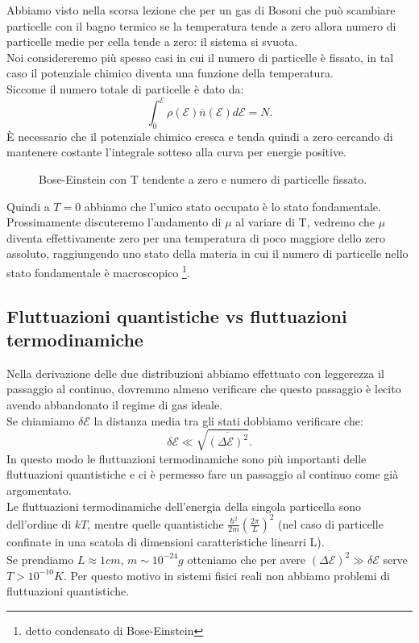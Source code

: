 Abbiamo visto nella scorsa lezione che per un gas di Bosoni che può scambiare particelle con il bagno termico se la temperatura tende a zero allora numero di particelle medie per cella tende a zero: il sistema si svuota.\\
Noi considereremo più spesso casi in cui il numero di particelle è fissato, in tal caso il potenziale chimico diventa una funzione della temperatura.\\
Siccome il numero totale di particelle è dato da:
\[
	\int_{0}^{\mathcal{E} } \rho ( \mathcal{E} ) \overline{n}( \mathcal{E} ) d\mathcal{E} = N 
.\] 
È necessario che il potenziale chimico cresca e tenda quindi a zero cercando di mantenere costante l'integrale sotteso alla curva per energie positive.
\begin{figure}[H]
    \centering
    \caption{\scriptsize Bose-Einstein con T tendente a zero e numero di particelle fissato.}
    \label{fig:bose-einstein-con-t-tendente-a-zero-e-numero-di-particelle-fissato.}
\end{figure}
\noindent
Quindi a $T=0$ abbiamo che l'unico stato occupato è lo stato fondamentale. Prossimamente discuteremo l'andamento di $\mu $ al variare di T, vedremo che $\mu $ diventa effettivamente zero per una temperatura di poco maggiore dello zero assoluto, raggiungendo uno stato della materia in cui il numero di particelle nello stato fondamentale è macroscopico \footnote{detto condensato di Bose-Einstein}.
\subsection{Fluttuazioni quantistiche vs fluttuazioni termodinamiche}%
Nella derivazione delle due distribuzioni abbiamo effettuato con leggerezza il passaggio al continuo, dovremmo almeno verificare che questo passaggio è lecito avendo abbandonato il regime di gas ideale.\\
Se chiamiamo $\delta \mathcal{E} $ la distanza media tra gli stati dobbiamo verificare che:
\[
	\delta \mathcal{E} \ll \sqrt{\overline{\left( \Delta \mathcal{E}  \right) ^2}} 
.\] 
In questo modo le fluttuazioni termodinamiche sono più importanti delle fluttuazioni quantistiche e ci è permesso fare un passaggio al continuo come già argomentato.\\
Le fluttuazioni termodinamiche dell'energia della singola particella sono dell'ordine di $kT$, mentre quelle quantistiche  $\frac{\hbar^2}{2m}\left( \frac{2\pi}{L} \right) ^2$ (nel caso di particelle confinate in una scatola di dimensioni caratteristiche linearri L).\\
Se prendiamo $L \approx 1cm$, $m \sim 10^{-24}g$ otteniamo che per avere $\overline{\left( \Delta \mathcal{E}  \right) ^2}\gg \delta \mathcal{E} $ serve $T> 10^{-10}K$. Per questo motivo in sistemi fisici reali non abbiamo problemi di fluttuazioni quantistiche.\\

